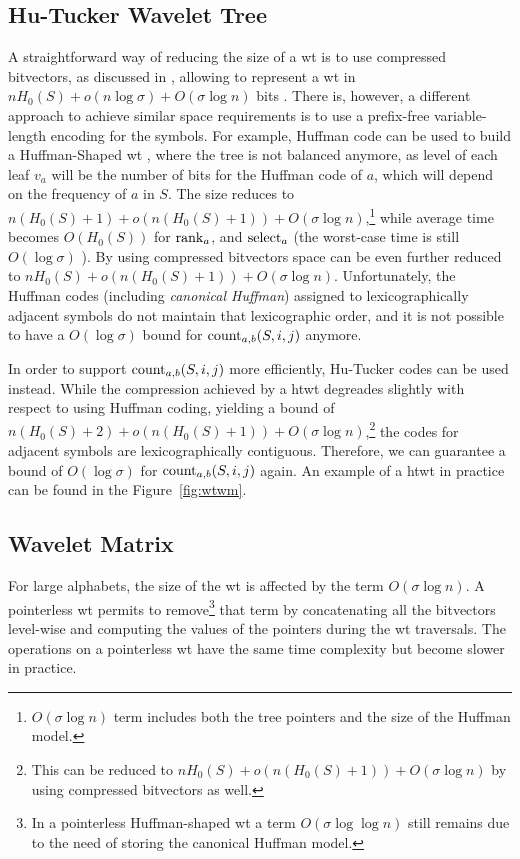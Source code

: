 \documentclass[a4paper,10pt,twoside]{book}
\begin{document}
    \subsection{Hu-Tucker Wavelet Tree}
    A straightforward way of reducing the size of a \gls{wt} is to use compressed bitvectors, as discussed in \cite{CNspire08.1}, allowing to represent a \gls{wt} in $nH_0(S) + o(n\log\sigma) + O(\sigma\log n)$ bits \cite{WT03}. There is, however, a different approach to achieve similar space requirements is to use a prefix-free variable-length encoding for the symbols.
    For example, Huffman code \cite{huffman1952method} can be used to build a
    Huffman-Shaped \gls{wt} \cite{ferragina2009compressed}, where the tree is not balanced
    anymore, as level of each leaf $v_a$ will be the number of bits for the Huffman code of $a$, which will depend on the frequency of $a$ in $S$. The size reduces to $n(H_0(S)+1)+ o(n(H_0(S)+1)) +  O(\sigma \log n)$,\footnote{$O(\sigma \log n)$ term 
    includes both the tree pointers and the size of the Huffman model.} while average time becomes
    $O(H_0(S))$ for $\operatorname{rank}_a$, and $\operatorname{select}_a$  (the worst-case time is still $O(\log\sigma)$ 
    \cite{Barbay:2013:CPA:2562345.2562626}). By using compressed
    bitvectors \cite{CNspire08.1} space can be even further reduced to $nH_0(S) + o(n(H_0(S)+1)) +  O(\sigma \log n)$.
    Unfortunately, the Huffman codes (including \textit{canonical Huffman}) assigned to
    lexicographically adjacent symbols do not maintain that lexicographic order, and it is not possible to have a $O(\log\sigma)$ bound for $\operatorname{count}_{a,b}(S,i,j)$ anymore.
	
	In order to support $\operatorname{count}_{a,b}(S,i,j)$ more efficiently, Hu-Tucker codes \cite{hu1971optimal} can be used instead. While the compression achieved by a \gls{htwt} \cite{barbay2009compressed} degreades slightly with respect to using Huffman coding, yielding a bound of $n(H_0(S)+2) + o(n(H_0(S)+1)) +  O(\sigma \log n)$,\footnote{This can be reduced to  $nH_0(S) + o(n(H_0(S)+1)) +  O(\sigma \log n)$ by using compressed bitvectors as well.} the codes for adjacent symbols are lexicographically contiguous. Therefore, we can guarantee a bound of $O(\log\sigma)$ for $\operatorname{count}_{a,b}(S,i,j)$ again. An example of a \gls{htwt} in practice can be found in the Figure~\ref{fig:wtwm}.
	
	\subsection{Wavelet Matrix}
	\label{sec:wm}
	For large alphabets, the size of the \gls{wt} is affected by the term $ O(\sigma \log n)$. A {pointerless}
    \gls{wt} \cite{CNspire08.1} permits to remove\footnote{In a pointerless Huffman-shaped \gls{wt}  a
    term $O(\sigma \log\log n)$ still remains due to the need of storing the canonical Huffman model.} 
    that term by concatenating all the bitvectors level-wise 
    and computing the values of the pointers during the \gls{wt} traversals. 
    The operations on a pointerless \gls{wt} have the same time complexity but become slower in practice. 
    
\end{document}
